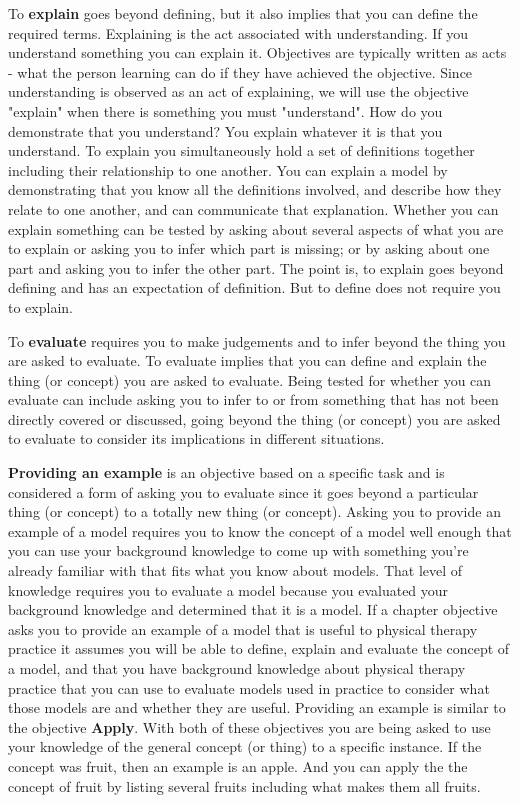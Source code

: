 To \textbf{explain} goes beyond defining, but it also implies that you can define the required terms. Explaining is the act associated with understanding. If you understand something you can explain it. Objectives are typically written as acts - what the person learning can do if they have achieved the objective. Since understanding is observed as an act of explaining, we will use the objective "explain" when there is something you must "understand". How do you demonstrate that you understand? You explain whatever it is that you understand. To explain you simultaneously hold a set of definitions together including their relationship to one another. You can explain a model by demonstrating that you know all the definitions involved, and describe how they relate to one another, and can communicate that explanation. Whether you can explain something can be tested by asking about several aspects of what you are to explain or asking you to infer which part is missing; or by asking about one part and asking you to infer the other part. The point is, to explain goes beyond defining and has an expectation of definition. But to define does not require you to explain. 

To \textbf{evaluate} requires you to make judgements and to infer beyond the thing you are asked to evaluate. To evaluate implies that you can define and explain the thing (or concept) you are asked to evaluate. Being tested for whether you can evaluate can include asking you to infer to or from something that has not been directly covered or discussed, going beyond the thing (or concept) you are asked to evaluate to consider its implications in different situations. 

\textbf{Providing an example} is an objective based on a specific task and is considered a form of asking you to evaluate since it goes beyond a particular thing (or concept) to a totally new thing (or concept). Asking you to provide an example of a model requires you to know the concept of a model well enough that you can use your background knowledge to come up with something you're already familiar with that fits what you know about models. That level of knowledge requires you to evaluate a model because you evaluated your background knowledge and determined that it is a model. If a chapter objective asks you to provide an example of a model that is useful to physical therapy practice it assumes you will be able to define, explain and evaluate the concept of a model, and that you have background knowledge about physical therapy practice that you can use to evaluate models used in practice to consider what those models are and whether they are useful. Providing an example is similar to the objective \textbf{Apply}. With both of these objectives you are being asked to use your knowledge of the general concept (or thing) to a specific instance. If the concept was fruit, then an example is an apple. And you can apply the the concept of fruit by listing several fruits including what makes them all fruits.

